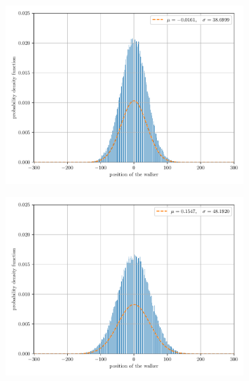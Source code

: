 \documentclass[paper=a4, fontsize=11pt]{scrartcl} %
\numberwithin{equation}{section} %
\numberwithin{figure}{section} %
\numberwithin{table}{section} %
\begin{document}
\begin{figure}[!htbp]
	\centering
	\begin{subfigure}[!b]{0.495\textwidth}
		\centering
		\includegraphics[width=\linewidth]{figure_1_0.pdf}
		\caption{}
	\end{subfigure}
	\begin{subfigure}[!b]{0.495\textwidth}
		\centering
		\includegraphics[width=\linewidth]{figure_1_1.pdf}
		\caption{}
	\end{subfigure}
	\begin{subfigure}[!b]{0.495\textwidth}
		\centering

\end{subfigure}
\end{figure}
\end{document}
